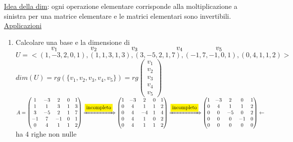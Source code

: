 \documentclass{article}
\newcommand{\hl}[1]{\colorbox{yellow}{#1}}
\newcommand{\ul}[1]{\underline{#1}}
\begin{document}
\ul{Idea della dim}: ogni operazione elementare corrisponde alla moltiplicazione a sinistra per una matrice elementare e le matrici elementari sono invertibili.\\

\ul{Applicazioni}

\begin{enumerate}
	\item Calcolare una base e la dimensione di\\
	  $\hspace*{5em}v_1\hspace*{4.8em}v_2\hspace*{5em}v_3\hspace*{5.6em}v_4\hspace*{4.8em}v_5$\\
	  $U=<(1,-3,2,0,1),(1,1,3,1,3),(3,-5,2,1,7),(-1,7,-1,0,1),(0,4,1,1,2)>$\\
	  $dim(U)=rg(\{v_1,v_2,v_3,v_4,v_5\})=rg\begin{pmatrix}v_1\\v_2\\v_3\\v_4\\v_5\end{pmatrix}$\\
	  $A=\begin{pmatrix}
			1  & -3 & 2  & 0 & 1 \\
			1  & 1  & 3  & 1 & 3 \\
			3  & -5 & 2  & 1 & 7 \\
			-1 & 7  & -1 & 0 & 1 \\
			0  & 4  & 1  & 1 & 2
		  \end{pmatrix}\xRightarrow{\hl{incompleto}}\begin{pmatrix}
			1 & -3 & 2  & 0 & 1 \\
			0 & 4  & 1  & 1 & 2 \\
			0 & 4  & -4 & 1 & 4 \\
			0 & 4  & 1  & 0 & 2 \\
			0 & 4  & 1  & 1 & 2
		  \end{pmatrix}\xRightarrow{\hl{incompleto}}\begin{pmatrix}
			1 & -3 & 2  & 0  & 1 \\
			0 & 4  & 1  & 1  & 2 \\
			0 & 0  & -5 & 0  & 2 \\
			0 & 0  & 0  & -1 & 0 \\
			0 & 0  & 0  & 0  & 0
		\end{pmatrix}\leftarrow$ ha 4 righe non nulle\\

\end{enumerate}
\end{document}
